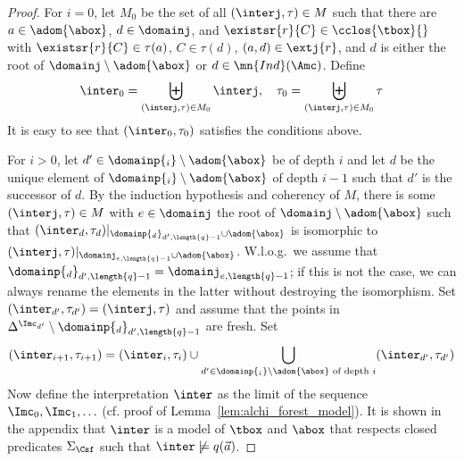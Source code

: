 \documentclass{lmcs}
\theoremstyle{definition}
\begin{document}
\begin{proof}
  For $i=0$, let $M_0$ be the set of all $(\interj,\tau)\in M$ such
  that there are $a\in\adom{\abox}$, $d\in\domainj$, and
  $\existsr{r}{C}\in\cclos{\tbox}{}$ with $\existsr{r}{C}\in\tau(a)$,
  $C\in\tau(d)$, $(a,d)\in\extj{r}$, and $d$ is either the root of
  $\domainj\setminus\adom{\abox}$ or $d\in \mn{Ind}(\Amc)$. Define
  $$
  \inter_0=\biguplus_{(\interj,\tau)\in M_0}\interj, \quad
  \tau_{0}=\biguplus_{(\interj,\tau)\in M_{0}}\tau
  $$
  It is easy to see that $(\inter_0,\tau_{0})$ satisfies the
  conditions above.

  For $i> 0$, let $d'\in\domainp{_i}\setminus\adom{\abox}$ be of depth
  $i$ and let $d$ be the unique element of 
  $\domainp{_i}\setminus\adom{\abox}$ of depth $i-1$ such that $d'$ is
  the successor of $d$. By the induction hypothesis and coherency of
  $M$, there is some $(\interj,\tau)\in M$ with $e\in\domainj$ the
  root of $\domainj\setminus\adom{\abox}$ such that
  $(\inter_d,\tau_d)|_{\domainp{_d}_{d',\length{q}-1}\cup\adom{\abox}}$
  is isomorphic to
  $(\interj,\tau)|_{\domainj_{e,\length{q}-1}\cup\adom{\abox}}$. W.l.o.g.\
  we assume that
  $\domainp{_d}_{d',\length{q}-1}=\domainj_{e,\length{q}-1}$; if this
  is not the case, we can always rename the elements in the latter
  without destroying the isomorphism. Set
  $(\inter_{d'},\tau_{d'})=(\interj,\tau)$ and assume that the points
  in $\Delta^{\Imc_{d'}}\setminus \domainp{_d}_{d',\length{q}-1}$ are
  fresh.  Set
  $$
  (\inter_{i+1},\tau_{i+1})=(\inter_{i}, \tau_{i})\cup
  \bigcup_{d'\in\domainp{_i}\setminus\adom{\abox}\text{ of depth
    }i}(\inter_{d'},\tau_{d'})
$$
Now define the interpretation $\inter$ as the limit of the 
sequence $\Imc_{0},\Imc_{1},\ldots$ (cf. proof of Lemma~\ref{lem:alchi_forest_model}).
It is shown in the appendix that $\inter$ is a model of $\tbox$ and $\abox$ that respects closed
predicates $\Sigma_\Csf$ such that $\inter\not\models q(\vec{a})$.
\end{proof}
\end{document}
